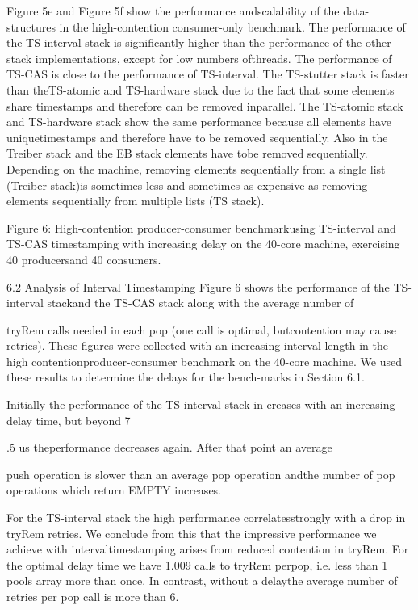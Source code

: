 Figure 5e and Figure 5f show the performance andscalability of the data-structures in the high-contention
consumer-only benchmark. The performance of the TS-interval stack is significantly higher than the performance of
the other stack implementations, except for low numbers ofthreads. The performance of TS-CAS is close to the performance of TS-interval. The TS-stutter stack is faster than theTS-atomic and TS-hardware stack due to the fact that some
elements share timestamps and therefore can be removed inparallel. The TS-atomic stack and TS-hardware stack show
the same performance because all elements have uniquetimestamps and therefore have to be removed sequentially.
Also in the Treiber stack and the EB stack elements have tobe removed sequentially. Depending on the machine, removing elements sequentially from a single list (Treiber stack)is sometimes less and sometimes as expensive as removing
elements sequentially from multiple lists (TS stack).

Figure 6: High-contention producer-consumer benchmarkusing TS-interval and TS-CAS timestamping with increasing delay on the 40-core machine, exercising 40 producersand 40 consumers.

6.2 Analysis of Interval Timestamping
Figure 6 shows the performance of the TS-interval stackand the TS-CAS stack along with the average number of

tryRem calls needed in each pop (one call is optimal, butcontention may cause retries). These figures were collected
with an increasing interval length in the high contentionproducer-consumer benchmark on the 40-core machine. We
used these results to determine the delays for the bench-marks in Section 6.1.

Initially the performance of the TS-interval stack in-creases with an increasing delay time, but beyond 7

.5 us theperformance decreases again. After that point an average

push operation is slower than an average pop operation andthe number of pop operations which return EMPTY increases.

For the TS-interval stack the high performance correlatesstrongly with a drop in tryRem retries. We conclude from this
that the impressive performance we achieve with intervaltimestamping arises from reduced contention in tryRem. For
the optimal delay time we have 1.009 calls to tryRem perpop, i.e. less than 1%
pools array more than once. In contrast, without a delaythe average number of retries per pop call is more than 6.

